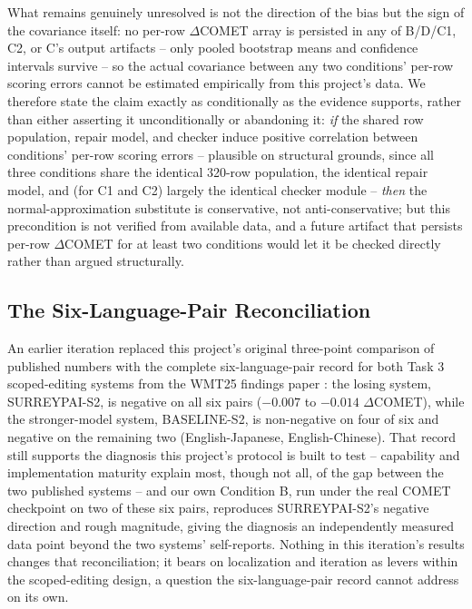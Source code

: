 \documentclass[11pt,letterpaper]{article}
\begin{document}
What remains genuinely unresolved is not the direction of the bias but the sign of the covariance itself: no per-row $\Delta$COMET array is persisted in any of B/D/C1, C2, or C's output artifacts -- only pooled bootstrap means and confidence intervals survive -- so the actual covariance between any two conditions' per-row scoring errors cannot be estimated empirically from this project's data. We therefore state the claim exactly as conditionally as the evidence supports, rather than either asserting it unconditionally or abandoning it: \emph{if} the shared row population, repair model, and checker induce positive correlation between conditions' per-row scoring errors -- plausible on structural grounds, since all three conditions share the identical 320-row population, the identical repair model, and (for C1 and C2) largely the identical checker module -- \emph{then} the normal-approximation substitute is conservative, not anti-conservative; but this precondition is not verified from available data, and a future artifact that persists per-row $\Delta$COMET for at least two conditions would let it be checked directly rather than argued structurally.

\subsection{The Six-Language-Pair Reconciliation}

An earlier iteration replaced this project's original three-point comparison of published numbers with the complete six-language-pair record for both Task 3 scoped-editing systems from the WMT25 findings paper \citep{Lavie2025}: the losing system, SURREYPAI-S2, is negative on all six pairs ($-0.007$ to $-0.014$ $\Delta$COMET), while the stronger-model system, BASELINE-S2, is non-negative on four of six and negative on the remaining two (English-Japanese, English-Chinese). That record still supports the diagnosis this project's protocol is built to test -- capability and implementation maturity explain most, though not all, of the gap between the two published systems -- and our own Condition B, run under the real COMET checkpoint on two of these six pairs, reproduces SURREYPAI-S2's negative direction and rough magnitude, giving the diagnosis an independently measured data point beyond the two systems' self-reports. Nothing in this iteration's results changes that reconciliation; it bears on localization and iteration as levers within the scoped-editing design, a question the six-language-pair record cannot address on its own.
\end{document}
